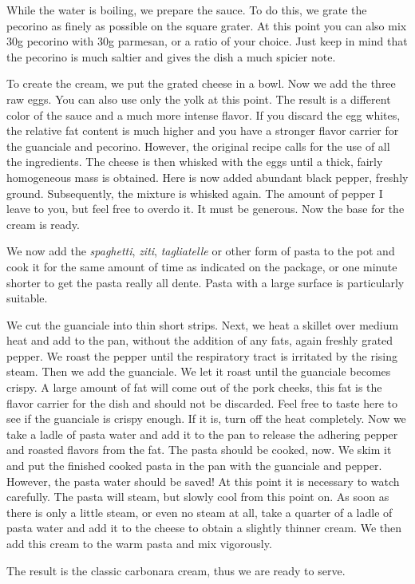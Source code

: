 While the water is boiling, we prepare the sauce. To do this, we grate the pecorino as finely as possible on the square grater. At this point you can also mix $30$g pecorino with $30$g parmesan, or a ratio of your choice. Just keep in mind that the pecorino is much saltier and gives the dish a much spicier note. 

To create the cream, we put the grated cheese in a bowl. Now we add the three raw eggs. You can also use only the yolk at this point. The result is a different color of the sauce and a much more intense flavor. If you discard the egg whites, the relative fat content is much higher and you have a stronger flavor carrier for the guanciale and pecorino. However, the original recipe calls for the use of all the ingredients. The cheese is then whisked with the eggs until a thick, fairly homogeneous mass is obtained. Here is now added abundant black pepper, freshly ground. Subsequently, the mixture is whisked again. The amount of pepper I leave to you, but feel free to overdo it. It must be generous. Now the base for the cream is ready.

We now add the \emph{spaghetti}, \emph{ziti}, \emph{tagliatelle} or other form of pasta to the pot and cook it for the same amount of time as indicated on the package, or one minute shorter to get the pasta really all dente. Pasta with a large surface is particularly suitable.

We cut the guanciale into thin short strips. Next, we heat a skillet over medium heat and add to the pan, without the addition of any fats, again freshly grated pepper. We roast the pepper until the respiratory tract is irritated by the rising steam. Then we add the guanciale. We let it roast until the guanciale becomes crispy. A large amount of fat will come out of the pork cheeks, this fat is the flavor carrier for the dish and should not be discarded. Feel free to taste here to see if the guanciale is crispy enough. If it is, turn off the heat completely. Now we take a ladle of pasta water and add it to the pan to release the adhering pepper and roasted flavors from the fat. The pasta should be cooked, now. We skim it and put the finished cooked pasta in the pan with the guanciale and pepper. However, the pasta water should be saved! At this point it is necessary to watch carefully. The pasta will steam, but slowly cool from this point on. As soon as there is only a little steam, or even no steam at all, take a quarter of a ladle of pasta water and add it to the cheese to obtain a slightly thinner cream. We then add this cream to the warm pasta and mix vigorously.

The result is the classic carbonara cream, thus we are ready to serve.

